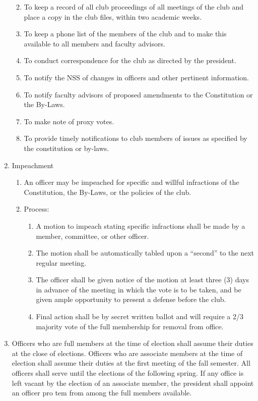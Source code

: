 \documentclass[
]{article}
\providecommand{\tightlist}{%
  \setlength{\itemsep}{0pt}\setlength{\parskip}{0pt}}
\begin{document}
\begin{enumerate}
  \begin{enumerate}
  \def\labelenumii{\Alph{enumii}.}
  \tightlist
  \item
    To keep a record of all club proceedings of all meetings of the club
    and place a copy in the club files, within two academic weeks.
  \item
    To keep a phone list of the members of the club and to make this
    available to all members and faculty advisors.
  \item
    To conduct correspondence for the club as directed by the president.
  \item
    To notify the NSS of changes in officers and other pertinent
    information.
  \item
    To notify faculty advisors of proposed amendments to the
    Constitution or the By-Laws.
  \item
    To make note of proxy votes.
  \item
    To provide timely notifications to club members of issues as
    specified by the constitution or by-laws.
  \end{enumerate}
\item
  Impeachment

  \begin{enumerate}
  \def\labelenumii{\Alph{enumii}.}
  \tightlist
  \item
    An officer may be impeached for specific and willful infractions of
    the Constitution, the By-Laws, or the policies of the club.
  \item
    Process:

    \begin{enumerate}
    \def\labelenumiii{\roman{enumiii}.}
    \tightlist
    \item
      A motion to impeach stating specific infractions shall be made by
      a member, committee, or other officer.
    \item
      The motion shall be automatically tabled upon a ``second'' to the
      next regular meeting.
    \item
      The officer shall be given notice of the motion at least three (3)
      days in advance of the meeting in which the vote is to be taken,
      and be given ample opportunity to present a defense before the
      club.
    \item
      Final action shall be by secret written ballot and will require a
      2/3 majority vote of the full membership for removal from office.
    \end{enumerate}
  \end{enumerate}
\item
  Officers who are full members at the time of election shall assume
  their duties at the close of elections. Officers who are associate
  members at the time of election shall assume their duties at the first
  meeting of the fall semester. All officers shall serve until the
  elections of the following spring. If any office is left vacant by the
  election of an associate member, the president shall appoint an
  officer pro tem from among the full members available.
\end{enumerate}
\end{document}
